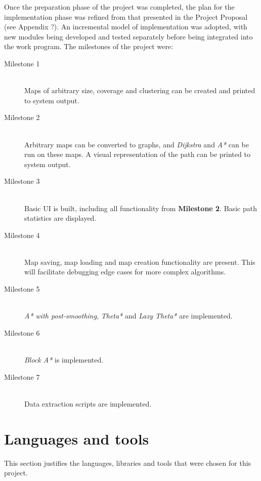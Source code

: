 \documentclass[12pt,notitlepage]{report}
\begin{document}
\noindent
Once the preparation phase of the project was completed, the plan for the implementation phase was refined from that presented in the Project Proposal (see Appendix ?). An incremental model of implementation was adopted, with new modules being developed and tested separately before being integrated into the work program. The milestones of the project were:
\begin{description}
\item[Milestone 1]\hfil \\
Maps of arbitrary size, coverage and clustering can be created and printed to system output.
\item[Milestone 2]\hfil \\
Arbitrary maps can be converted to graphs, and {\em Dijkstra} and {\em A*} can be run on these maps. A visual representation of the path can be printed to system output.
\item[Milestone 3]\hfil \\
Basic UI is built, including all functionality from {\bfseries Milestone 2}. Basic path statistics are displayed.
\item[Milestone 4]\hfil \\
Map saving, map loading and map creation functionality are present. This will facilitate debugging edge cases for more complex algorithms.
\item[Milestone 5]\hfil \\
{\em A* with post-smoothing}, {\em Theta*} and {\em Lazy Theta*} are implemented.
\item[Milestone 6]\hfil \\
{\em Block A*} is implemented.
\item[Milestone 7]\hfil \\
Data extraction scripts are implemented.
\end{description}

\section {Languages and tools}

This section justifies the languages, libraries and tools that were chosen for this project.
\end{document}
